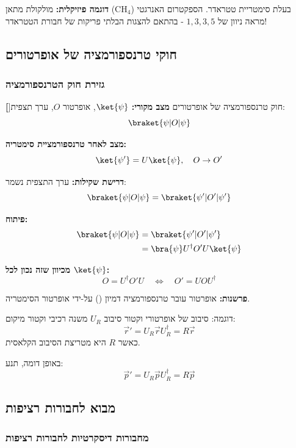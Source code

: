 \textbf{דוגמה פיזיקלית:} מולקולת מתאן (CH$_4$) בעלת סימטריית טטראדר. הספקטרום האנרגטי מראה ניוון של $1, 3, 3, 5$ - בהתאם להצגות הבלתי פריקות של חבורת הטטראדר!

\subsection{חוקי טרנספורמציה של אופרטורים}

\subsubsection{גזירת חוק הטרנספורמציה}

\textbf[]{חוק טרנספורמציה של אופרטורים}
\textbf{מצב מקורי:} $\ket{\psi}$, אופרטור $O$, ערך תצפית:
\[
\braket{\psi | O | \psi}
\]

\textbf{מצב לאחר טרנספורמציית סימטריה:}
\[
\ket{\psi'} = U \ket{\psi}, \quad O \to O'
\]

\textbf{דרישת שקילות:} ערך התצפית נשמר:
\[
\braket{\psi | O | \psi} = \braket{\psi' | O' | \psi'}
\]

\textbf{פיתוח:}
\begin{align*}
\braket{\psi | O | \psi} &= \braket{\psi' | O' | \psi'} \\
&= \bra{\psi} U^\dagger O' U \ket{\psi}
\end{align*}

\textbf{מכיוון שזה נכון לכל $\ket{\psi}$:}
\[
\boxed{O = U^\dagger O' U \quad \Leftrightarrow \quad O' = U O U^\dagger}
\]


\textbf{פרשנות:} אופרטור עובר טרנספורמציה דמיון () על-ידי אופרטור הסימטריה.

\begin{examplebox}[label=ex:rotation_operator]{דוגמה: סיבוב של אופרטורי וקטור}
סיבוב $U_R$ משנה רכיבי וקטור מיקום:
\[
\vec{r}' = U_R \vec{r} U_R^\dagger = R \vec{r}
\]
כאשר $R$ היא מטריצת הסיבוב הקלאסית.

באופן דומה, תנע:
\[
\vec{p}' = U_R \vec{p} U_R^\dagger = R \vec{p}
\]
\end{examplebox}

\subsection{מבוא לחבורות רציפות}

\subsubsection{מחבורות דיסקרטיות לחבורות רציפות}

